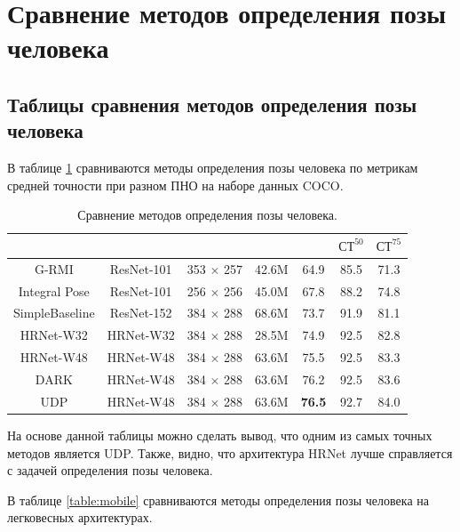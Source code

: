 \section{Сравнение методов определения позы человека}

\subsection{Таблицы сравнения методов определения позы человека}

 В таблице \ref{table:standart} сравниваются методы определения позы человека по метрикам средней точности при разном ПНО на наборе данных COCO.

\begin{table}[ht!]
	\centering
	\caption{Сравнение методов определения позы человека.}
	\label{table:standart}
	\begin{tabular}{|c|c|c|c|c|c|c|}
		\hline
		\text{Метод} & \text{Архитектура} & \text{Вход} & \text{Параметры} & \text{СТ} & $\text{СТ}^{50}$ & $\text{СТ}^{75}$\\
		\hline
		G-RMI \cite{45680} & ResNet-101 & 353 $\times$ 257 & 42.6M & 64.9 & 85.5 & 71.3 \\
		\hline
		Integral Pose \cite{sun2017integral} & ResNet-101 & 256 $\times$ 256 & 45.0M & 67.8 & 88.2 & 74.8 \\
		\hline
		SimpleBaseline \cite{xiao2018simple} & ResNet-152 & 384 $\times$ 288 & 68.6M & 73.7 & 91.9 & 81.1 \\
		\hline
		HRNet-W32 \cite{sun2019deep} & HRNet-W32 & 384 $\times$ 288 & 28.5M & 74.9 & 92.5 & 82.8 \\
		\hline
		HRNet-W48 \cite{SunXLW19} & HRNet-W48 & 384 $\times$ 288 & 63.6M & 75.5 & 92.5 & 83.3 \\
		\hline
		DARK \cite{Zhang_2020_CVPR} & HRNet-W48 & 384 $\times$ 288 & 63.6M & 76.2 & 92.5 & 83.6 \\
		\hline
		UDP \cite{huang2020aid} & HRNet-W48 & 384 $\times$ 288 & 63.6M & \textbf{76.5} & 92.7 & 84.0 \\
		\hline
	\end{tabular}
\end{table}

На основе данной таблицы можно сделать вывод, что одним из самых точных методов является UDP. 
Также, видно, что архитектура HRNet лучше справляется с задачей определения позы человека.

В таблице \ref{table:mobile} сравниваются методы определения позы человека на легковесных архитектурах.

